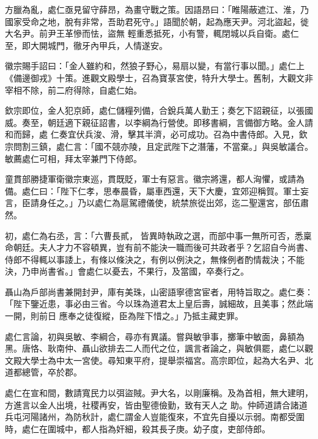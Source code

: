 \begin{pinyinscope}
 方臘為亂，處仁亟見留守薛昂，為畫守戰之策。因語昂曰：「睢陽蔽遮江、淮，乃國家受命之地，脫有非常，吾助君死守。」語聞於朝，起為應天尹。河北盜起，徙大名尹。前尹王革慘而怯，盜無
 輕重悉抵死，小有警，輒閉城以兵自衛。處仁至，即大開城門，徹牙內甲兵，人情遂安。



 徽宗賜手詔曰：「金人雖約和，然狼子野心，易扇以變，有當行事以聞。」處仁上《備邊御戎》十策。進觀文殿學士，召為寶菉宮使，特升大學士。舊制，大觀文非宰相不除，前二府得除，自處仁始。



 欽宗即位，金人犯京師，處仁儲糧列備，合銳兵萬人勤王；奏乞下詔親征，以張國威。奏至，朝廷適下親征詔書，以李綱為行營使。即移書綱，言備御方略。金人請和而歸，處
 仁奏宜伏兵浚、滑，擊其半濟，必可成功。召為中書侍郎。入見，欽宗問割三鎮，處仁言：「國不競亦陵，且定武陛下之潛藩，不當棄。」與吳敏議合。敏薦處仁可相，拜太宰兼門下侍郎。



 童貫部勝捷軍衛徽宗東巡，貫既貶，軍士有惡言。徽宗將還，都人洶懼，或請為備。處仁曰：「陛下仁孝，思奉晨昏，屬車西還，天下大慶，宜郊迎稱賀。軍士妄言，臣請身任之。」乃以處仁為扈駕禮儀使，統禁旅從出郊，迄二聖還宮，部伍肅然。



 初，處仁為右丞，言：「六曹長貳，
 皆異時執政之選，而部中事一無所可否，悉稟命朝廷。夫人才力不容頓異，豈有前不能決一職而後可共政者乎？乞詔自今尚書、侍郎不得輒以事諉上，有條以條決之，有例以例決之，無條例者酌情裁決；不能決，乃申尚書省。」會處仁以憂去，不果行，及當國，卒奏行之。



 聶山為戶部尚書兼開封尹，庫有美珠，山密語寧德宮宦者，用特旨取之。處仁奏：「陛下鑒近患，事必由三省。今以珠為道君太上皇后壽，誠細故，且美事；然此端一開，則前日
 應奉之徒復縱，臣為陛下惜之。」乃抵主藏吏罪。



 處仁言論，初與吳敏、李綱合，尋亦有異議。嘗與敏爭事，擲筆中敏面，鼻額為黑。唐恪、耿南仲、聶山欲排去二人而代之位，諷言者論之，與敏俱罷，處仁以觀文殿大學士為中太一宮使。尋知東平府，提舉崇福宮。高宗即位，起為大名尹、北道都總管，卒於郡。



 處仁在宣和間，數請寬民力以弭盜賊。尹大名，以剛廉稱。及為首相，無大建明，方進言以金人出境，社稷再安，皆由聖德儉勤，致有天人之
 助。仲師道請合諸道兵屯河陽諸州，為防秋計，處仁謂金人豈能復來，不宜先自擾以示弱。南都受圍時，處仁在圍城中，都人指為奸細，殺其長子庚。幼子度，吏部侍郎。




\end{pinyinscope}
